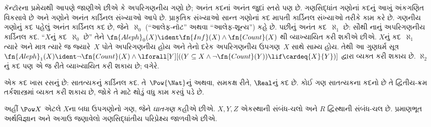 કૅન્ટૉરના પ્રમેયથી આપણે જાણીએ છીએ કે અપરિગણનીય ગણો છે;
અનંત કદનાં અનંત જુદાં સ્તરો પણ છે. ગણસિદ્ધાંત ગણોનાં કદનું આખું
અંકગણિત વિકસાવે છે અને ગણોને અનંત કાર્ડિનલ સંખ્યાઓ આપે છે. પ્રાકૃતિક
સંખ્યાઓ સાન્ત ગણોનાં કદ માપતી કાર્ડિનલ સંખ્યાઓ તરીકે કામ કરે છે.
ગણનીય ગણોનું કદ પહેલું અનંત કાર્ડિનલ કદ છે, જેને~$\aleph_0$
(``આલેફ-નૉટ'' અથવા ``આલેફ-શૂન્ય'') કહે છે. પછીનું અનંત કદ~$\aleph_1$
છે: સૌથી નાનું અપરિગણનીય કાર્ડિનલ કદ. ``$X$નું કદ~$\aleph_0$ છે''
તેને $\fn{Aleph}_0(X) \ident \fn{Inf}(X) \land \fn{Count}(X)$
થી વ્યાખ્યાયિત કરી શકીએ છીએ. $X$નું કદ~$\aleph_1$ ત્યારે અને માત્ર
ત્યારે જ જ્યારે~$X$ પોતે અપરિગણનીય હોય અને તેનો દરેક અપરિગણનીય
ઉપગણ~$X$ સાથે સામ્ય હોય. તેથી આ ગુણધર્મ સૂત્ર
$\fn{Aleph}_1(X) \ident \lnot\fn{Count}(X) \land
\lforall[Y][((Y \subseteq X \land \lnot\fn{Count}(Y))
  \lif \cardeq{X}{Y})]$ દ્વારા વ્યક્ત કરી શકાય છે. $\aleph_2$નું
કદ પણ એ જ રીતે વ્યાખ્યાયિત કરી શકાય છે; વગેરે.

એક કદ ખાસ રસનું છે: સાતત્યકનું કાર્ડિનલ કદ. તે~$\Pow{\Nat}$નું
અથવા, સમકક્ષ રીતે, $\Real$નું કદ છે. કોઈ ગણ સાતત્યકના કદનો છે
તે દ્વિતીય-ક્રમ તર્કશાસ્ત્રમાં વ્યક્ત કરી શકાય છે, જોકે તે માટે
થોડું વધુ કામ કરવું પડે છે.
\endgroup


\begingroup
\makeatletter{}\makeatother


\label{guunit:OLP-0340}


અહીં $\Pow X$ એટલે $X$ના બધા ઉપગણોનો ગણ, જેને \emph{ઘાતગણ}
કહીએ છીએ. $X,Y,Z$ એકસ્થાની સંબંધ-ચલો અને $R$ દ્વિસ્થાની
સંબંધ-ચલ છે. પ્રમાણભૂત અર્થવિજ્ઞાન અને અગાઉ જણાવેલો
ગણસિદ્ધાંતીય પરિપ્રેક્ષ્ય જાળવીએ છીએ.

